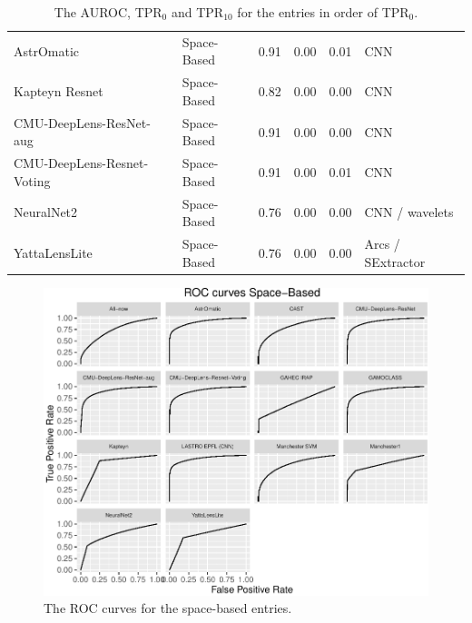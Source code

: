 \documentclass{aa}
\begin{document}
\begin{table}
\begin{tabular}{llrrrl}
   AstrOmatic & Space-Based & 0.91 & 0.00 & 0.01 & CNN \\ 
   Kapteyn Resnet& Space-Based & 0.82 & 0.00 & 0.00 & CNN \\ 
   CMU-DeepLens-ResNet-aug & Space-Based & 0.91 & 0.00 & 0.00 & CNN \\ 
   CMU-DeepLens-Resnet-Voting & Space-Based & 0.91 & 0.00 & 0.01 & CNN \\ 
   NeuralNet2 & Space-Based & 0.76 & 0.00 & 0.00 & CNN / wavelets \\ 
   YattaLensLite & Space-Based & 0.76 & 0.00 & 0.00 & Arcs / SExtractor \\ 
   \hline
\end{tabular}
\caption{The AUROC, TPR$_0$ and TPR$_{10}$ for the entries in order of TPR$_0$.  }
\label{table:TPR0}
\end{table}

\begin{figure}
 \includegraphics[width=2\columnwidth]{figures/roc_space.pdf}
 \caption{The ROC curves for the space-based entries.}
 \label{fig:roc_space}
\end{figure}
\end{document}
